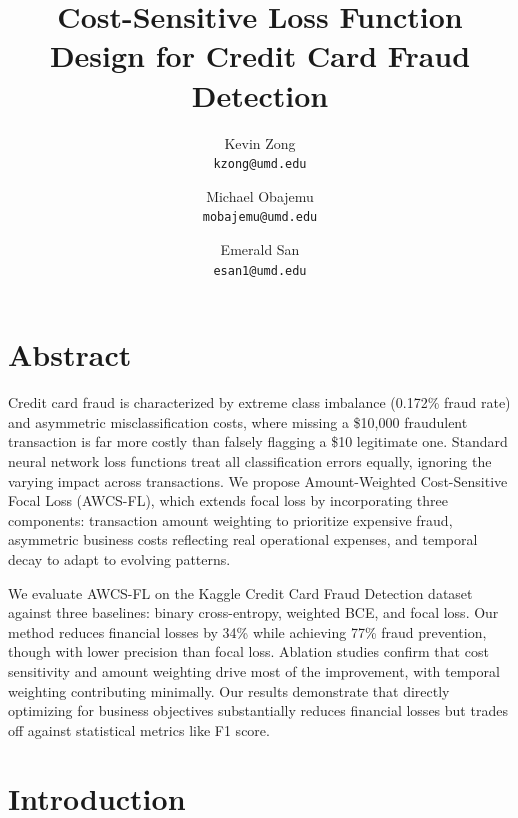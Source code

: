 \documentclass[10pt,twocolumn,letterpaper]{article}
\begin{document}
\title{Cost-Sensitive Loss Function Design for Credit Card Fraud Detection}

\author{Kevin Zong\\
{\tt\small kzong@umd.edu}
\and
Michael Obajemu\\
{\tt\small mobajemu@umd.edu}
\and
Emerald San\\
{\tt\small esan1@umd.edu}
}

\maketitle

\section{Abstract}
Credit card fraud is characterized by extreme class imbalance (0.172\% fraud rate) and asymmetric misclassification costs,
 where missing a \$10,000 fraudulent transaction is far more costly than falsely flagging a \$10 legitimate one.
 Standard neural network loss functions treat all classification errors equally, ignoring the varying impact across transactions.
 We propose Amount-Weighted Cost-Sensitive Focal Loss (AWCS-FL), which extends focal loss by incorporating three components: 
 transaction amount weighting to prioritize expensive fraud, asymmetric business costs reflecting real operational expenses, 
 and temporal decay to adapt to evolving patterns. 

 We evaluate AWCS-FL on the Kaggle Credit Card Fraud Detection dataset against three baselines: binary cross-entropy, weighted BCE,
 and focal loss. Our method reduces financial losses by 34\% while achieving  77\% fraud prevention, though with lower precision than
  focal loss. Ablation studies confirm that cost sensitivity and amount weighting drive most of the improvement, with temporal weighting contributing minimally.
  Our results demonstrate that directly optimizing for business objectives substantially reduces financial losses but trades off against statistical metrics like F1 score.

\section{Introduction}
\end{document}
